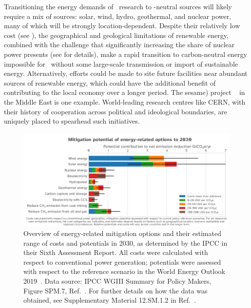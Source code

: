 \documentclass[../SustainableHEP.tex]{subfiles}
\begin{document}
Transitioning the energy demands of \ACR\ research to \CdO-neutral sources will likely require a mix of sources: solar, wind, hydro, geothermal, and nuclear power, many of which will be strongly location-dependent. Despite their relatively low cost (see ), the
geographical and geological limitations of renewable energy, combined with the challenge that significantly increasing the share of nuclear power presents (see  for details), make a rapid transition to carbon-neutral energy impossible for \ACR\ without some large-scale transmission or import of sustainable energy. Alternatively, efforts could be made to site future facilities near abundant sources of renewable energy, which could have the additional benefit of contributing to the local economy over a longer period. The \acrshort{sesame}) project ~\cite{Sesame} in the Middle East is one example.  World-leading research centres like CERN,  with their history of cooperation across political and ideological boundaries, are uniquely placed to spearhead such initiatives.  

\begin{figure}[!ht]
     \centering
     \includegraphics[width=0.99\linewidth]{Sections/Figs/Energy/IPCCMitigationPotential.png}
     \caption[IPCC 
    Mitigation potential for alternative sources of energy]{Overview of energy-related mitigation options and their estimated range of costs and potentials in 2030, as determined by the IPCC in their Sixth Assessment Report. All costs were calculated with respect to conventional power generation; potentials were assessed with respect to the reference scenario in the World Energy Outlook 2019~\cite{IEA2019}.  Data source: IPCC WGIII Summary for Policy Makers, Figure SPM.7, Ref.~\cite{IPCCMitigationData}.  For further details on how the data was obtained, see Supplementary Material 12.SM.1.2 in Ref.~\cite{IPCCMitigationReport}.}
     \label{fig:ene-mitigation}
 \end{figure}
\end{document}
